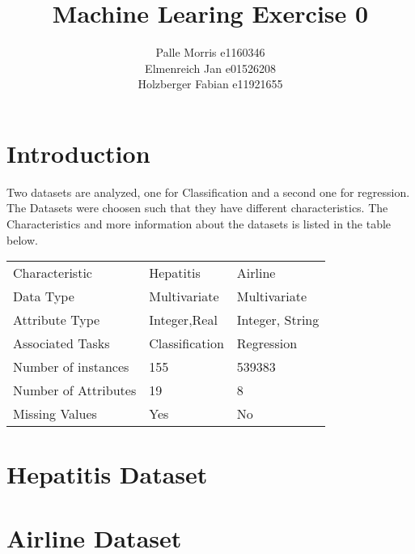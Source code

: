 \documentclass[11pt]{article}
\begin{document}
\author{Palle Morris e1160346\\ Elmenreich Jan e01526208\\ Holzberger Fabian e11921655 }
\title{Machine Learing Exercise 0}
\maketitle

\medskip

\section{Introduction}
Two datasets are analyzed, one for Classification and a second one for regression. The Datasets were choosen such that they have different characteristics. The Characteristics and more information about the datasets is listed in the table below.
\newline

\begin{tabular}{lll}
\hline
Characteristic 		& Hepatitis 	& Airline   \\
Data Type 		& Multivariate 	& Multivariate \\
Attribute Type  	& Integer,Real  & Integer, String\\
Associated Tasks	& Classification & Regression \\
Number of instances     & 155 		 & 539383\\
Number of Attributes    & 19 		& 8\\
Missing Values 		& Yes 		& No \\
\hline
\end{tabular}
\newline



\section{Hepatitis Dataset}

\section{Airline Dataset}
\end{document}
